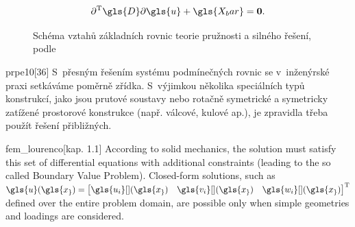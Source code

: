 \begin{equation}
    \label{eq:strong_form}
    \partial^{\mathrm{T}} \gls{D} \partial{\gls{u}} + \gls{X_bar} = \matr{0}.
\end{equation}

\begin{figure}[H]
    \caption[Schéma vztahů základních rovnic teorie pružnosti a silného řešení]{Schéma vztahů základních rovnic teorie pružnosti a silného řešení, podle \cite[obr. 1.2]{fem_lourenco}}
    \label{fig:elasticity_diagram}
\end{figure}


\begin{citeQuote}{prpe10}[36]
    S~přesným řešením systému podmínečných rovnic se v~inženýrské praxi setkáváme poměrně zřídka. S~výjimkou několika speciálních typů konstrukcí, jako jsou prutové soustavy nebo rotačně symetrické a symetricky zatížené prostorové konstrukce (např. válcové, kulové ap.), je zpravidla třeba použít řešení přibližných.
\end{citeQuote}

\begin{citeQuote}{fem_lourenco}[kap. 1.1]
    According to solid mechanics, the solution must satisfy this set of differential equations with additional constraints (leading to the so called Boundary Value Problem). Closed-form solutions, such as ${\gls{u}(\gls{x_})=\begin{bmatrix}
        \gls{u_i}[ ](\gls{x_}) & \gls{v_i}[ ](\gls{x_}) & \gls{w_i}[ ](\gls{x_})
    \end{bmatrix}^{\mathrm{T}}}$ defined over the entire problem domain, are possible only when simple geometries and loadings are considered.
\end{citeQuote}